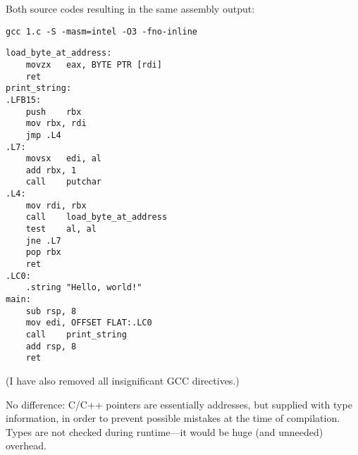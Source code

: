 Both source codes resulting in the same assembly output:

\begin{lstlisting}
gcc 1.c -S -masm=intel -O3 -fno-inline
\end{lstlisting}

\begin{lstlisting}[style=customasmx86]
load_byte_at_address:
	movzx	eax, BYTE PTR [rdi]
	ret
print_string:
.LFB15:
	push	rbx
	mov	rbx, rdi
	jmp	.L4
.L7:
	movsx	edi, al
	add	rbx, 1
	call	putchar
.L4:
	mov	rdi, rbx
	call	load_byte_at_address
	test	al, al
	jne	.L7
	pop	rbx
	ret
.LC0:
	.string	"Hello, world!"
main:
	sub	rsp, 8
	mov	edi, OFFSET FLAT:.LC0
	call	print_string
	add	rsp, 8
	ret
\end{lstlisting}

(I have also removed all insignificant GCC directives.)

No difference: C/C++ pointers are essentially addresses, but supplied with type information, in order to prevent possible mistakes at the time of compilation.
Types are not checked during runtime---it would be huge (and unneeded) overhead.

